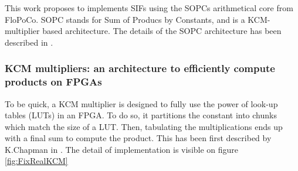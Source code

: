 	This work proposes to implements SIFs using the SOPCs arithmetical core from FloPoCo.
	SOPC stands for Sum of Producs by Constants, and is a KCM-multiplier based architecture.
	The details of the SOPC architecture has been described in \cite{sums}.

	\subsubsection{KCM multipliers: an architecture to efficiently compute products on FPGAs}
	To be quick, a KCM multiplier is designed to fully use the power of look-up tables (LUTs) in an FPGA.
	To do so, it partitions the constant into chunks which match the size of a LUT.
	Then, tabulating the multiplications ends up with a final sum to compute the product.
	This has been first described by K.Chapman in \cite{Chapman93:edn}.
	The detail of implementation is visible on figure \ref{fig:FixRealKCM}

